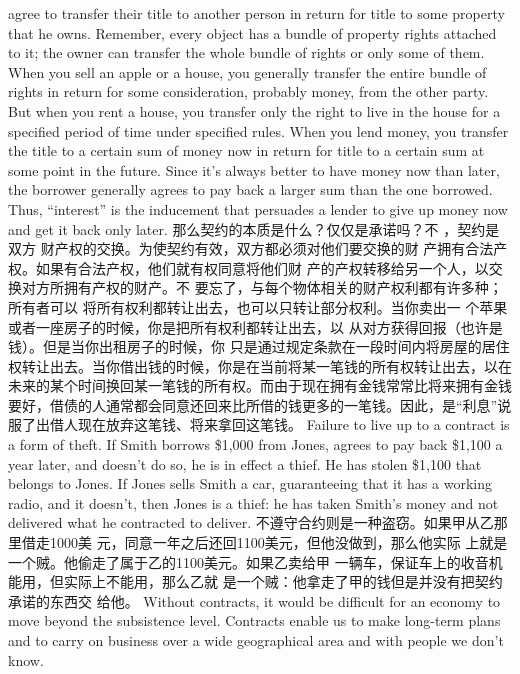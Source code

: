 \begin{paracol}{2}
agree to transfer their title to another person in return for title
to some property that he owns. Remember, every object has a
bundle of property rights attached to it; the owner can transfer
the whole bundle of rights or only some of them. When you sell
an apple or a house, you generally transfer the entire bundle of
rights in return for some consideration, probably money, from
the other party. But when you rent a house, you transfer only
the right to live in the house for a specified period of time under
specified rules. When you lend money, you transfer the title to
a certain sum of money now in return for title to a certain sum
at some point in the future. Since it's always better to have
money now than later, the borrower generally agrees to pay
back a larger sum than the one borrowed. Thus, ``interest'' is
the inducement that persuades a lender to give up money now
and get it back only later.
\switchcolumn
那么契约的本质是什么？仅仅是承诺吗？不 ，契约是双方
财产权的交换。为使契约有效，双方都必须对他们要交换的财
产拥有合法产权。如果有合法产权，他们就有权同意将他们财
产的产权转移给另一个人，以交换对方所拥有产权的财产。不
要忘了，与每个物体相关的财产权利都有许多种；所有者可以
将所有权利都转让出去，也可以只转让部分权利。当你卖出一
个苹果或者一座房子的时候，你是把所有权利都转让出去，以
从对方获得回报（也许是钱）。但是当你出租房子的时候，你
只是通过规定条款在一段时间内将房屋的居住权转让出去。当你借出钱的时候，你是在当前将某一笔钱的所有权转让出去，以在未来的某个时间换回某一笔钱的所有权。而由于现在拥有金钱常常比将来拥有金钱要好，借债的人通常都会同意还回来比所借的钱更多的一笔钱。因此，是“利息”说服了出借人现在放弃这笔钱、将来拿回这笔钱。
\switchcolumn*
Failure to live up to a contract is a form of theft. If Smith borrows \$1,000 from Jones, agrees to pay back \$1,100 a year later,
and doesn't do so, he is in effect a thief. He has stolen \$1,100
that belongs to Jones. If Jones sells Smith a car, guaranteeing
that it has a working radio, and it doesn't, then Jones is a thief:
he has taken Smith's money and not delivered what he contracted to deliver.
\switchcolumn
不遵守合约则是一种盗窃。如果甲从乙那里借走1000美
元，同意一年之后还回1100美元，但他没做到，那么他实际
上就是一个贼。他偷走了属于乙的1100美元。如果乙卖给甲
一辆车，保证车上的收音机能用，但实际上不能用，那么乙就
是一个贼：他拿走了甲的钱但是并没有把契约承诺的东西交
给他。
\switchcolumn*
Without contracts, it would be difficult for an economy to move beyond the subsistence level. Contracts enable us to make
long-term plans and to carry on business over a wide geographical area and with people we don't know.

\end{paracol}
